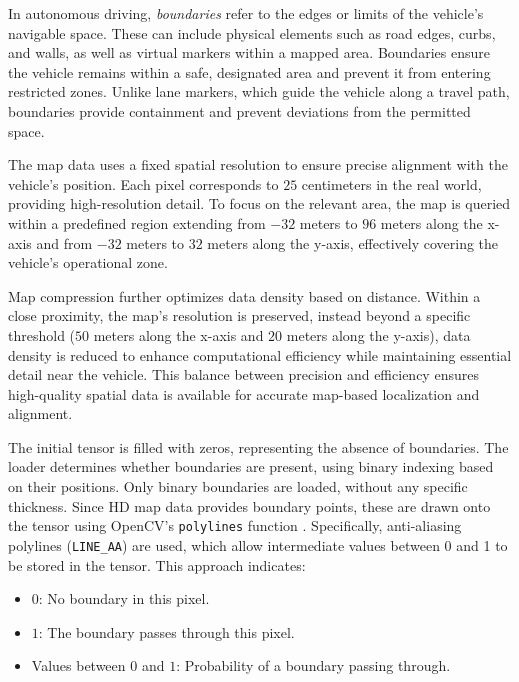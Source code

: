 \begin{itemize}
    In autonomous driving, \textit{boundaries} refer to the edges or limits of the vehicle's navigable space. These can include physical elements such as road edges, curbs, and walls, as well as virtual markers within a mapped area. Boundaries ensure the vehicle remains within a safe, designated area and prevent it from entering restricted zones. Unlike lane markers, which guide the vehicle along a travel path, boundaries provide containment and prevent deviations from the permitted space.
    
    The map data uses a fixed spatial resolution to ensure precise alignment with the vehicle’s position. Each pixel corresponds to $25$ centimeters in the real world, providing high-resolution detail. To focus on the relevant area, the map is queried within a predefined region extending from $-32$ meters to $96$ meters along the x-axis and from $-32$ meters to $32$ meters along the y-axis, effectively covering the vehicle’s operational zone.
    
    Map compression further optimizes data density based on distance. Within a close proximity, the map’s resolution is preserved, instead beyond a specific threshold ($50$ meters along the x-axis and $20$ meters along the y-axis), data density is reduced to enhance computational efficiency while maintaining essential detail near the vehicle. This balance between precision and efficiency ensures high-quality spatial data is available for accurate map-based localization and alignment.
    
    The initial tensor is filled with zeros, representing the absence of boundaries. The loader determines whether boundaries are present, using binary indexing based on their positions. Only binary boundaries are loaded, without any specific thickness. Since HD map data provides boundary points, these are drawn onto the tensor using OpenCV’s \texttt{polylines} function \cite{itseez2015opencv}. Specifically, anti-aliasing polylines (\texttt{LINE\_AA}) are used, which allow intermediate values between 0 and 1 to be stored in the tensor. This approach indicates:
    \begin{itemize}
        \item $0$: No boundary in this pixel.
        \item $1$: The boundary passes through this pixel.
        \item Values between $0$ and $1$: Probability of a boundary passing through.
    \end{itemize}


\end{itemize}
